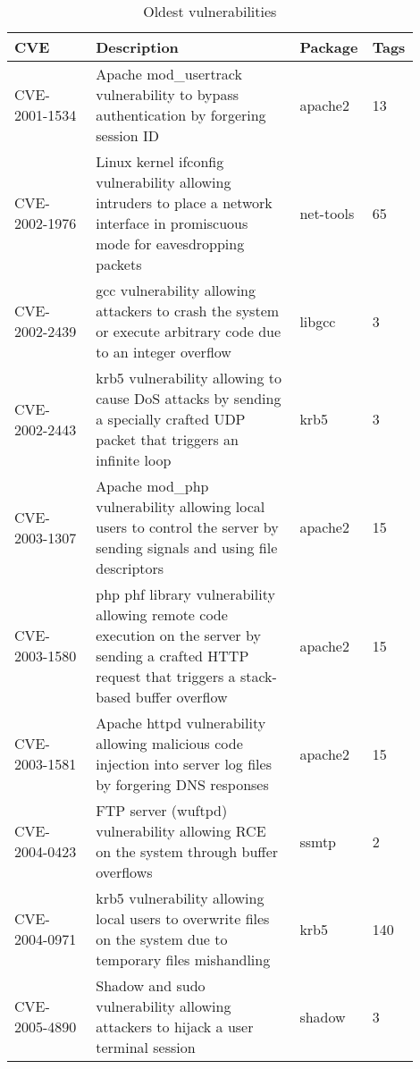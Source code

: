 \begin{table}[hbt]
    \centering
    \begin{tabular}{| p{0.2\linewidth} | p{0.5\linewidth} | p{0.12\linewidth} | p{0.08\linewidth} |}
        \hline
        \centering \textbf{CVE} & \centering \textbf{Description} & \centering \textbf{Package} & \centering\arraybackslash \textbf{Tags} \\ \hline 
        CVE-2001-1534 & Apache mod\_usertrack vulnerability to bypass authentication by forgering session ID & apache2 & 13 \\ \hline
        CVE-2002-1976 & Linux kernel ifconfig vulnerability allowing intruders to place a network interface in promiscuous mode for eavesdropping packets & net-tools & 65 \\ \hline
        CVE-2002-2439 & gcc vulnerability allowing attackers to crash the system or execute arbitrary code due to an integer overflow & libgcc & 3 \\ \hline
        CVE-2002-2443 & krb5 vulnerability allowing to cause DoS attacks by sending a specially crafted UDP packet that triggers an infinite loop & krb5 & 3 \\ \hline
        CVE-2003-1307 & Apache mod\_php vulnerability allowing local users to control the server by sending signals and using file descriptors & apache2 & 15 \\ \hline
        CVE-2003-1580 & php phf library vulnerability allowing remote code execution on the server by sending a crafted HTTP request that triggers a stack-based buffer overflow & apache2 & 15 \\ \hline
        CVE-2003-1581 & Apache httpd vulnerability allowing malicious code injection into server log files by forgering DNS responses & apache2 & 15 \\ \hline
        CVE-2004-0423 & FTP server (wuftpd) vulnerability allowing RCE on the system through buffer overflows & ssmtp & 2 \\ \hline
        CVE-2004-0971 & krb5 vulnerability allowing local users to overwrite files on the system due to temporary files mishandling & krb5 & 140 \\ \hline
        CVE-2005-4890 & Shadow and sudo vulnerability allowing attackers to hijack a user terminal session & shadow & 3 \\ \hline
    \end{tabular}
    \caption{Oldest vulnerabilities}
    \label{tab:oldcve}
\end{table}


